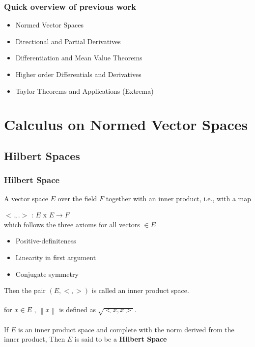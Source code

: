 \documentclass{beamer}
\newcommand\norm[1]{\left\lVert#1\right\rVert}
\begin{document}
\begin{frame}
\frametitle{Quick overview of previous work}

\begin{itemize}
\item Normed Vector Spaces
\item Directional and Partial Derivatives
\item Differentiation and Mean Value Theorems
\item Higher order Differentials and Derivatives
\item Taylor Theorems and Applications (Extrema)

\end{itemize}
\end{frame}


\section{Calculus on Normed Vector Spaces}

\subsection{Hilbert Spaces}

\begin{frame}
\frametitle{Hilbert Space}
A vector space $E$ over the field $F$ together with an inner product, i.e., with a map

\hspace{2cm} $<.,.>$ : $E$ x $E \to F$ \\

which follows the three axioms for all vectors $\in E$
\begin{itemize}
\item Positive-definiteness
\item Linearity in first argument
\item Conjugate symmetry
\end{itemize}
Then the pair $( E, <,>)$ is called an inner product space.\\~\\

for $x \in E$ , $\norm{x}$ is defined as $ \sqrt{ <x,x>} $.\\~\\

If $E$ is an inner product space and complete with the norm derived from the inner product, Then $E$ is said to be a \textbf{Hilbert Space} 
\end{frame}
\end{document}
